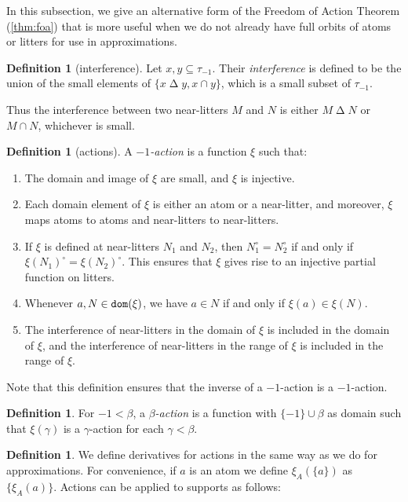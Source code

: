 \documentclass{article}
\theoremstyle{definition}
\newtheorem{definition}[theorem]{Definition}
\theoremstyle{remark}
\begin{document}
{In this subsection, we give an alternative form of the Freedom of Action Theorem (\ref{thm:foa}) that is more useful when we do not already have full orbits of atoms or litters for use in approximations.
\begin{definition}[interference]\label{def:interference}
Let $x, y \subseteq \tau_{-1}$.
Their {\em interference\/} is defined to be the union of the small elements of $\{ x \mathbin\Delta y, x \cap y \}$, which is a small subset of $\tau_{-1}$.
\end{definition}
Thus the interference between two near-litters $M$ and $N$ is either $M \mathbin\Delta N$ or $M \cap N$, whichever is small.

\begin{definition}[actions]\label{def:base_action}
  A {\em $-1$-action\/} is a function $\xi$ such that:
  \begin{enumerate}
    \item The domain and image of $\xi$ are small, and $\xi$ is injective.
    \item Each domain element of $\xi$ is either an atom or a near-litter, and moreover, $\xi$ maps atoms to atoms and near-litters to near-litters.
    \item If $\xi$ is defined at near-litters $N_1$ and $N_2$, then $N_1^\circ = N_2^\circ$ if and only if $\xi(N_1)^\circ = \xi(N_2)^\circ$.
    This ensures that $\xi$ gives rise to an injective partial function on litters.
    \item Whenever $a, N \in {\tt dom}(\xi)$, we have $a \in N$ if and only if $\xi(a) \in \xi(N)$.
    \item The interference of near-litters in the domain of $\xi$ is included in the domain of $\xi$, and the interference of near-litters in the range of $\xi$ is included in the range of $\xi$.
  \end{enumerate}
  Note that this definition ensures that the inverse of a $-1$-action is a $-1$-action.
\end{definition}
\begin{definition}\label{def:str_action}
  For $-1 < \beta$, a {\em $\beta$-action\/} is a function with $\{-1\}\cup \beta$ as domain such that $\xi(\gamma)$ is a $\gamma$-action for each $\gamma < \beta$.
\end{definition}
\begin{definition}
  We define derivatives for actions in the same way as we do for approximations.
  For convenience, if $a$ is an atom we define $\xi_A(\{a\})$ as $\{\xi_A(a)\}$.
  Actions can be applied to supports as follows:

\end{definition}}
\end{document}
